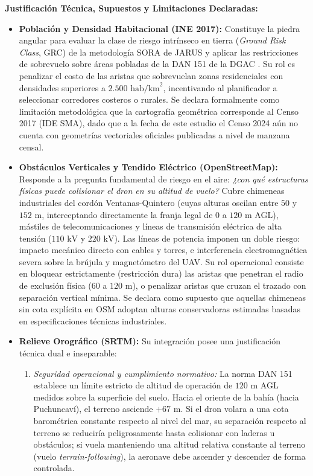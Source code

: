 \documentclass[letterpaper,12pt]{article}
\begin{document}
\noindent \textbf{Justificación Técnica, Supuestos y Limitaciones Declaradas:}
\begin{itemize}
    \item \textbf{Población y Densidad Habitacional (INE 2017):} Constituye la piedra angular para evaluar la clase de riesgo intrínseco en tierra (\textit{Ground Risk Class}, GRC) de la metodología SORA de JARUS \cite{sora} y aplicar las restricciones de sobrevuelo sobre áreas pobladas de la DAN 151 de la DGAC \cite{dan151}. Su rol es penalizar el costo de las aristas que sobrevuelan zonas residenciales con densidades superiores a $2.500\text{ hab/km}^2$, incentivando al planificador a seleccionar corredores costeros o rurales. Se declara formalmente como limitación metodológica que la cartografía geométrica corresponde al Censo 2017 (IDE SMA), dado que a la fecha de este estudio el Censo 2024 aún no cuenta con geometrías vectoriales oficiales publicadas a nivel de manzana censal.
    \item \textbf{Obstáculos Verticales y Tendido Eléctrico (OpenStreetMap):} Responde a la pregunta fundamental de riesgo en el aire: \textit{¿con qué estructuras físicas puede colisionar el dron en su altitud de vuelo?} Cubre chimeneas industriales del cordón Ventanas-Quintero (cuyas alturas oscilan entre $50$ y $152\text{ m}$, interceptando directamente la franja legal de $0$ a $120\text{ m}$ AGL), mástiles de telecomunicaciones y líneas de transmisión eléctrica de alta tensión ($110\text{ kV}$ y $220\text{ kV}$). Las líneas de potencia imponen un doble riesgo: impacto mecánico directo con cables y torres, e interferencia electromagnética severa sobre la brújula y magnetómetro del UAV. Su rol operacional consiste en bloquear estrictamente (restricción dura) las aristas que penetran el radio de exclusión física ($60$ a $120\text{ m}$), o penalizar aristas que cruzan el trazado con separación vertical mínima. Se declara como supuesto que aquellas chimeneas sin cota explícita en OSM adoptan alturas conservadoras estimadas basadas en especificaciones técnicas industriales.
    \item \textbf{Relieve Orográfico (SRTM):} Su integración posee una justificación técnica dual e inseparable:
    \begin{enumerate}
        \item \textit{Seguridad operacional y cumplimiento normativo:} La norma DAN 151 establece un límite estricto de altitud de operación de $120\text{ m}$ AGL medidos sobre la superficie del suelo. Hacia el oriente de la bahía (hacia Puchuncaví), el terreno asciende $+67\text{ m}$. Si el dron volara a una cota barométrica constante respecto al nivel del mar, su separación respecto al terreno se reduciría peligrosamente hasta colisionar con laderas u obstáculos; si vuela manteniendo una altitud relativa constante al terreno (vuelo \textit{terrain-following}), la aeronave debe ascender y descender de forma controlada.

\end{enumerate}
\end{itemize}
\end{document}
